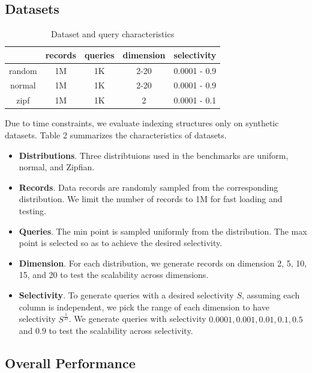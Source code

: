 \documentclass[sigconf,10pt]{acmart}
\begin{document}
\subsection{Datasets}

\begin{table}[h]
  \centering
  \begin{tabular}{|c|c|c|c|c|}
    \hline
          & records & queries & dimension & selectivity \\
    \hline
    random & 1M & 1K & 2-20 & 0.0001 - 0.9 \\
    \hline
    normal & 1M & 1K & 2-20 & 0.0001 - 0.9 \\
    \hline
    zipf & 1M & 1K & 2 & 0.0001 - 0.1 \\
    \hline 
  \end{tabular}
  \caption{Dataset and query characteristics}
  \label{table:dataset}
\end{table}

Due to time constraints, we evaluate indexing structures only on synthetic datasets.
Table 2 summarizes the characteristics of datasets.
\begin{itemize}
  \item \textbf{Distributions}. Three distribtuions used in the benchmarks are uniform, normal,
  and Zipfian.
  \item \textbf{Records}. Data records are randomly sampled from the corresponding distribution.
  We limit the number of records to 1M for fast loading and testing.
  \item \textbf{Queries}. The min point
  is sampled uniformly from the distribution. The max point is selected so as to achieve
  the desired selectivity.
  \item \textbf{Dimension}. For each distribution, we generate records on dimension 2, 5, 10, 15,
  and 20 to test the scalability across dimensions.
  \item \textbf{Selectivity}. To generate queries with a desired selectivity $S$, assuming each column is independent,
  we pick the range of each dimension to have selectivity $S^{\frac{1}{D}}$. We generate queries with
  selectivity $0.0001, 0.001, 0.01, 0.1, 0.5$ and $0.9$ to test the scalability across selectivity.
\end{itemize}

\subsection{Overall Performance}
\end{document}
